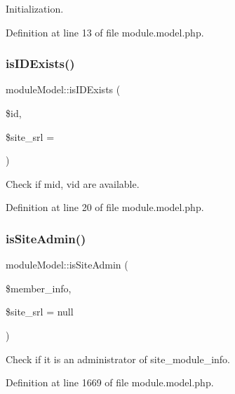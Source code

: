 Initialization. 



Definition at line 13 of file module.\+model.\+php.

\hypertarget{classmoduleModel_a5f53ae1101876e8967cc3c40e54badcd}{}\label{classmoduleModel_a5f53ae1101876e8967cc3c40e54badcd} 
\subsubsection{\texorpdfstring{is\+I\+D\+Exists()}{isIDExists()}}
{\footnotesize\ttfamily module\+Model\+::is\+I\+D\+Exists (\begin{DoxyParamCaption}\item[{}]{\$id,  }\item[{}]{\$site\+\_\+srl = {} }\end{DoxyParamCaption})}



Check if mid, vid are available. 



Definition at line 20 of file module.\+model.\+php.

\hypertarget{classmoduleModel_aae55c42d2818ffd09f81d6cb215c59ff}{}\label{classmoduleModel_aae55c42d2818ffd09f81d6cb215c59ff} 
\subsubsection{\texorpdfstring{is\+Site\+Admin()}{isSiteAdmin()}}
{\footnotesize\ttfamily module\+Model\+::is\+Site\+Admin (\begin{DoxyParamCaption}\item[{}]{\$member\+\_\+info,  }\item[{}]{\$site\+\_\+srl = {\ttfamily null} }\end{DoxyParamCaption})}



Check if it is an administrator of site\+\_\+module\+\_\+info. 



Definition at line 1669 of file module.\+model.\+php.

\hypertarget{classmoduleModel_adfde81ebf0fcb2814ba49ad23ce803ff}{}\label{classmoduleModel_adfde81ebf0fcb2814ba49ad23ce803ff} 

